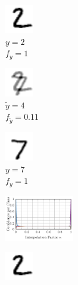 \begin{figure}[t]
\begin{subfigure}{0.225\textwidth}
    \end{subfigure}
    \begin{subfigure}{0.085\textwidth}
        \centering
        \includegraphics[height=1.25cm]{fig_mnist_ours10_0_interpolation_0}\\
        \tiny $y{=}2$\\
        $f_y{=}1$
    \end{subfigure}
    \begin{subfigure}{0.085\textwidth}
        \centering
        \includegraphics[height=1.25cm]{fig_mnist_ours10_0_interpolation_05}\\
        \tiny $\tilde{y}{=}4$\\
        {\color{red}$f_{\tilde{y}}{=}0.11$}
    \end{subfigure}
    \begin{subfigure}{0.085\textwidth}
        \centering
        \includegraphics[height=1.25cm]{fig_mnist_ours10_0_interpolation_1}\\
        \tiny $y{=}7$\\
        $f_y{=}1$
    \end{subfigure}
    \begin{subfigure}{0.225\textwidth}
        \includegraphics[height=2cm]{fig_mnist_ours10_4_interpolation}
    \end{subfigure}
    \begin{subfigure}{0.085\textwidth}
        \centering
        \includegraphics[height=1.25cm]{fig_mnist_ours10_4_interpolation_0}\\

\end{subfigure}
\end{figure}

